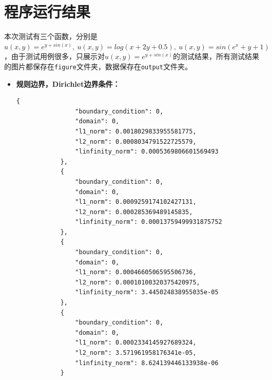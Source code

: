 \documentclass[UTF8]{ctexart}
\begin{document}
	\section{程序运行结果}
	本次测试有三个函数，分别是$u(x,y)=e^{y+sin(x)},\ u(x,y)=log(x+2y+0.5),\ u(x,y)=sin(e^x+y+1)$，由于测试用例很多，只展示对$u(x,y)=e^{y+sin(x)}$的测试结果，所有测试结果的图片都保存在\texttt{figure}文件夹，数据保存在\texttt{output}文件夹。
	\begin{itemize}
		\item \textbf{规则边界，Dirichlet边界条件：}
				\begin{lstlisting}[style=json]
			{
				"boundary_condition": 0,
				"domain": 0,
				"l1_norm": 0.0018029833955581775,
				"l2_norm": 0.0008034791522725579,
				"linfinity_norm": 0.0005369806601569493
			},
			{
				"boundary_condition": 0,
				"domain": 0,
				"l1_norm": 0.0009259174102427131,
				"l2_norm": 0.000285369489145835,
				"linfinity_norm": 0.00013759499931875752
			},
			{
				"boundary_condition": 0,
				"domain": 0,
				"l1_norm": 0.0004660506595506736,
				"l2_norm": 0.00010100320375420975,
				"linfinity_norm": 3.445024838955035e-05
			},
			{
				"boundary_condition": 0,
				"domain": 0,
				"l1_norm": 0.0002334145927689324,
				"l2_norm": 3.571961958176341e-05,
				"linfinity_norm": 8.624139446133938e-06
			}
		\end{lstlisting}
		

\end{itemize}
\end{document}
